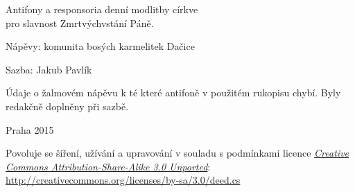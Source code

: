 \documentclass[a5paper, twoside, 12pt]{article}
\begin{document}
\pagebreak
{}




\vspace{6mm}


\clearpage

\mbox{}
\vfill

\pagestyle{empty}

\setlength{\parindent}{0pt}

Antifony a responsoria denní modlitby církve\\
pro slavnost Zmrtvýchvstání Páně.

Nápěvy: komunita bosých karmelitek Dačice

Sazba: Jakub Pavlík

Údaje o žalmovém nápěvu k té které antifoně v použitém rukopisu chybí.
Byly redakčně doplněny při sazbě.

Praha 2015

\vspace{5mm}

Povoluje se šíření, užívání a upravování v souladu s podmínkami
licence \href{http://creativecommons.org/licenses/by-sa/3.0/deed.cs}{\emph{Creative Commons At\-tri\-bu\-tion-\-Sha\-re-A\-li\-ke 3.0 Unported}}:
\href{http://creativecommons.org/licenses/by-sa/3.0/deed.cs}{http://creativecommons.org/licenses/by-sa/3.0/deed.cs}
\end{document}
